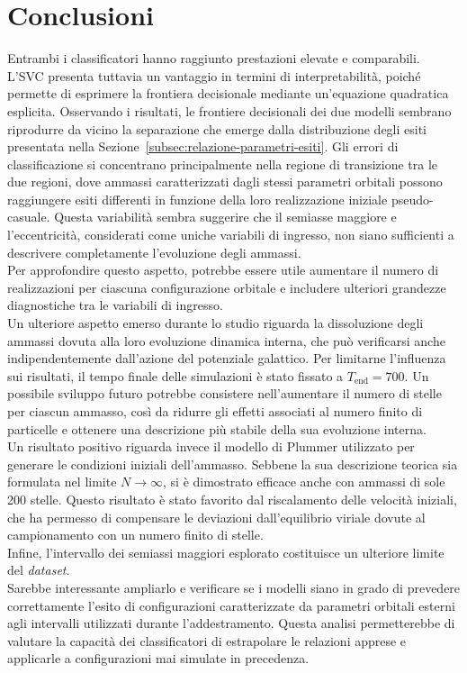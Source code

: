 \chapter{Conclusioni}
\label{cha:conclusioni}
Entrambi i classificatori hanno raggiunto prestazioni elevate e comparabili. L'SVC presenta tuttavia un vantaggio in termini di interpretabilità, poiché permette di esprimere la frontiera decisionale mediante un'equazione quadratica esplicita. Osservando i risultati, le frontiere decisionali dei due modelli sembrano riprodurre da vicino la separazione che emerge dalla distribuzione degli esiti presentata nella Sezione~\ref{subsec:relazione-parametri-esiti}. Gli errori di classificazione si concentrano principalmente nella regione di transizione tra le due regioni, dove ammassi caratterizzati dagli stessi parametri orbitali possono raggiungere esiti differenti in funzione della loro realizzazione iniziale pseudo-casuale. Questa variabilità sembra suggerire che il semiasse maggiore e l'eccentricità, considerati come uniche variabili di ingresso, non siano sufficienti a descrivere completamente l'evoluzione degli ammassi.\\ Per approfondire questo aspetto, potrebbe essere utile aumentare il numero di realizzazioni per ciascuna configurazione orbitale e includere ulteriori grandezze diagnostiche tra le variabili di ingresso.\\
\newline Un ulteriore aspetto emerso durante lo studio riguarda la dissoluzione degli ammassi dovuta alla loro evoluzione dinamica interna, che può verificarsi anche indipendentemente dall'azione del potenziale galattico. Per limitarne l'influenza sui risultati, il tempo finale delle simulazioni è stato fissato a $T_{\mathrm{end}}=700$. Un possibile sviluppo futuro potrebbe consistere nell'aumentare il numero di stelle per ciascun ammasso, così da ridurre gli effetti associati al numero finito di particelle e ottenere una descrizione più stabile della sua evoluzione interna.\\
\newline Un risultato positivo riguarda invece il modello di Plummer utilizzato per generare le condizioni iniziali dell'ammasso. Sebbene la sua descrizione teorica sia formulata nel limite $N\to\infty$, si è dimostrato efficace anche con ammassi di sole 200 stelle. Questo risultato è stato favorito dal riscalamento delle velocità iniziali, che ha permesso di compensare le deviazioni dall'equilibrio viriale dovute al campionamento con un numero finito di stelle.\\
\newline Infine, l'intervallo dei semiassi maggiori esplorato costituisce un ulteriore limite del \emph{dataset}.\\ Sarebbe interessante ampliarlo e verificare se i modelli siano in grado di prevedere correttamente l'esito di configurazioni caratterizzate da parametri orbitali esterni agli intervalli utilizzati durante l'addestramento. Questa analisi permetterebbe di valutare la capacità dei classificatori di estrapolare le relazioni apprese e applicarle a configurazioni mai simulate in precedenza.